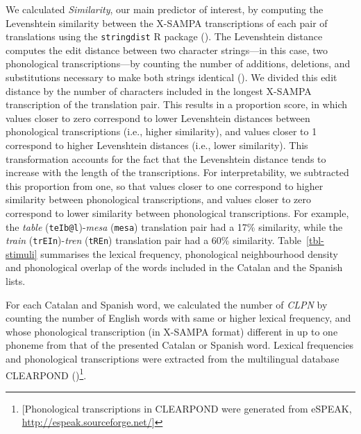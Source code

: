 \documentclass[
]{article}
\begin{document}
We calculated \emph{Similarity}, our main predictor of interest, by
computing the Levenshtein similarity between the X-SAMPA transcriptions
of each pair of translations using the \texttt{stringdist} R package
(). The Levenshtein
distance computes the edit distance between two character strings---in
this case, two phonological transcriptions---by counting the number of
additions, deletions, and substitutions necessary to make both strings
identical (). We
divided this edit distance by the number of characters included in the
longest X-SAMPA transcription of the translation pair. This results in a
proportion score, in which values closer to zero correspond to lower
Levenshtein distances between phonological transcriptions (i.e., higher
similarity), and values closer to 1 correspond to higher Levenshtein
distances (i.e., lower similarity). This transformation accounts for the
fact that the Levenshtein distance tends to increase with the length of
the transcriptions. For interpretability, we subtracted this proportion
from one, so that values closer to one correspond to higher similarity
between phonological transcriptions, and values closer to zero
correspond to lower similarity between phonological transcriptions. For
example, the \emph{table} (\texttt{teIb@l})-\emph{mesa} (\texttt{mesa})
translation pair had a 17\% similarity, while the \emph{train}
(\texttt{trEIn})-\emph{tren} (\texttt{tREn}) translation pair had a 60\%
similarity. Table~\ref{tbl-stimuli} summarises the lexical frequency,
phonological neighbourhood density and phonological overlap of the words
included in the Catalan and the Spanish lists.

For each Catalan and Spanish word, we calculated the number of
\emph{CLPN} by counting the number of English words with same or higher
lexical frequency, and whose phonological transcription (in X-SAMPA
format) different in up to one phoneme from that of the presented
Catalan or Spanish word. Lexical frequencies and phonological
transcriptions were extracted from the multilingual database CLEARPOND
()\footnote{{[}Phonological
  transcriptions in CLEARPOND were generated from eSPEAK,
  \url{http://espeak.sourceforge.net/}{]}}.
\end{document}
